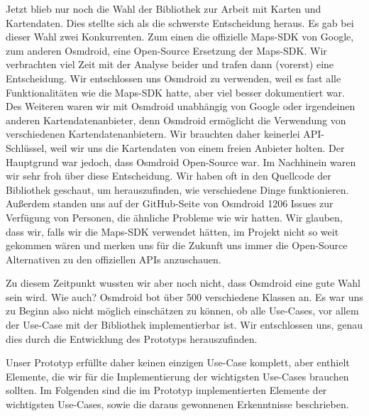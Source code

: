 \documentclass[10pt]{article}
\begin{document}
Jetzt blieb nur noch die Wahl der Bibliothek zur Arbeit mit Karten und Kartendaten. Dies stellte sich als die
schwerste Entscheidung heraus. Es gab bei dieser Wahl zwei Konkurrenten. Zum einen die offizielle
Maps-SDK von Google, zum anderen Osmdroid, eine Open-Source Ersetzung der Maps-SDK. Wir verbrachten viel Zeit
mit der Analyse beider und trafen dann (vorerst) eine Entscheidung. Wir entschlossen uns Osmdroid zu verwenden, weil es fast alle Funktionalitäten wie die Maps-SDK hatte, aber viel besser dokumentiert war. Des Weiteren
waren wir mit Osmdroid unabhängig von Google oder irgendeinen anderen Kartendatenanbieter, denn
Osmdroid ermöglicht die Verwendung von verschiedenen Kartendatenanbietern. Wir brauchten daher
keinerlei API-Schlüssel, weil wir uns die Kartendaten von einem freien Anbieter holten.
Der Hauptgrund war jedoch, dass Osmdroid Open-Source war. Im Nachhinein waren wir sehr froh über diese Entscheidung.
Wir haben oft in den Quellcode der Bibliothek geschaut, um herauszufinden, wie verschiedene Dinge funktionieren.
Außerdem standen uns auf der GitHub-Seite von Osmdroid 1206 Issues zur Verfügung von Personen, die ähnliche
Probleme wie wir hatten. Wir glauben, dass wir, falls wir die Maps-SDK verwendet hätten, im Projekt nicht so weit
gekommen wären und merken uns für die Zukunft uns immer die Open-Source Alternativen zu den offiziellen APIs
anzuschauen.\par
\medskip
Zu diesem Zeitpunkt wussten wir aber noch nicht, dass Osmdroid eine gute Wahl sein wird. Wie auch?
Osmdroid bot über 500 verschiedene Klassen an. Es war uns zu Beginn also nicht möglich einschätzen zu können,
ob alle Use-Cases, vor allem der Use-Case  mit der Bibliothek implementierbar ist.
Wir entschlossen uns, genau dies durch die Entwicklung des Prototyps herauszufinden.\par
\medskip
Unser Prototyp erfüllte daher keinen einzigen Use-Case komplett, aber enthielt Elemente, die wir für die
Implementierung der wichtigsten Use-Cases brauchen sollten. Im Folgenden sind die im Prototyp implementierten Elemente
der wichtigsten Use-Cases, sowie die daraus gewonnenen Erkenntnisse beschrieben.
\end{document}
